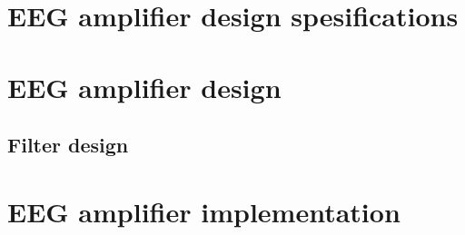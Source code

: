 \section{EEG amplifier design spesifications}
\section{EEG amplifier design}
\subsection{Filter design}
\section{EEG amplifier implementation}
